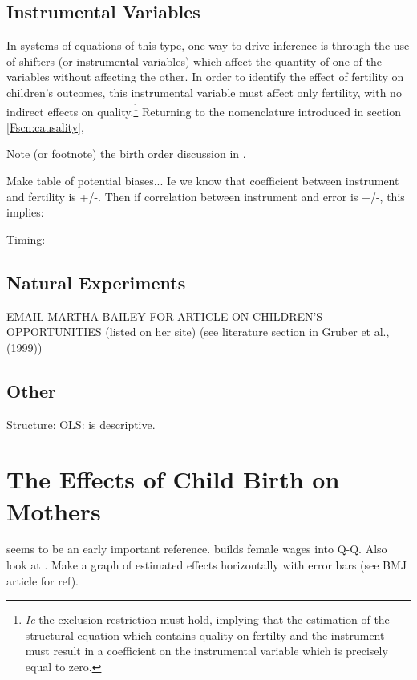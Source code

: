 \subsection{Instrumental Variables}
In systems of equations of this type, one way to drive inference is through the
use of shifters (or instrumental variables) which affect the quantity of one of
the variables without affecting the other.  In order to identify the effect of 
fertility on children's outcomes, this instrumental variable must affect only 
fertility, with no indirect effects on quality.\footnote{\emph{Ie} the exclusion 
restriction must hold, implying that the estimation of the structural equation 
which contains quality on fertilty and the instrument must result in a 
coefficient on the instrumental variable which is precisely equal to zero.}
Returning to the nomenclature introduced in section \ref{Fscn:causality},

\citet{Bougmaetal2015,Blacketal2005,Blacketal2010,
Angristetal2010,ConleyGlauber2006,
RosenzweigWolpin1980,Beckeretal2010,MillimetWang2011,Lee2008}
Note (or footnote) the birth order discussion in \citet{Blacketal2005}.

Make table of potential biases...  Ie we know that coefficient between 
instrument and fertility is +/-.  Then if correlation between instrument
and error is +/-, this implies:

Timing: \citet{Miller2009}

\subsection{Natural Experiments}
EMAIL MARTHA BAILEY FOR ARTICLE ON CHILDREN'S OPPORTUNITIES (listed on her site)
\citet{OltmansHungerman2012, Gruberetal1999,PopEleches2006,BleakleyLange2009,
RosenzweigZhang2009, Qian2009,Hossain1989}
(see literature section in Gruber et al., (1999))

\subsection{Other}
Structure: \citet{RosenzweigWolpin1995,RosenzweigSchultz1985,
RosenzweigWolpin1980b}
OLS: \citet{Hanushek1992} is descriptive. \citet{Desai1995}


\section{The Effects of Child Birth on Mothers}
\citet{FleisherRhodes1979} seems to be an early important reference. 
\citet{Willis1973} builds female wages into Q-Q.  Also look at \citet{Reuben1973}.
Make a graph of estimated effects horizontally with error bars (see BMJ 
article for ref).


